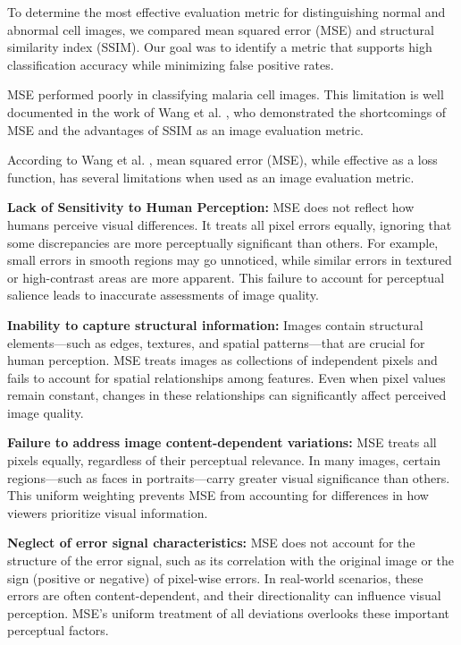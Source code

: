\documentclass[journal,12pt,onecolumn,draftcls]{IEEEtran}
\begin{document}
To determine the most effective evaluation metric for distinguishing normal and abnormal cell images, we compared mean squared error (MSE) and structural similarity index (SSIM). Our goal was to identify a metric that supports high classification accuracy while minimizing false positive rates.

MSE performed poorly in classifying malaria cell images. This limitation is well documented in the work of Wang et al. \cite{wang2009}, who demonstrated the shortcomings of MSE and the advantages of SSIM as an image evaluation metric.

According to Wang et al. \cite{wang2009}, mean squared error (MSE), while effective as a loss function, has several limitations when used as an image evaluation metric.

\textbf{Lack of Sensitivity to Human Perception:} MSE does not reflect how humans perceive visual differences. It treats all pixel errors equally, ignoring that some discrepancies are more perceptually significant than others. For example, small errors in smooth regions may go unnoticed, while similar errors in textured or high-contrast areas are more apparent. This failure to account for perceptual salience leads to inaccurate assessments of image quality.

\textbf{Inability to capture structural information:} Images contain structural elements—such as edges, textures, and spatial patterns—that are crucial for human perception. MSE treats images as collections of independent pixels and fails to account for spatial relationships among features. Even when pixel values remain constant, changes in these relationships can significantly affect perceived image quality.

\textbf{Failure to address image content-dependent variations:} MSE treats all pixels equally, regardless of their perceptual relevance. In many images, certain regions—such as faces in portraits—carry greater visual significance than others. This uniform weighting prevents MSE from accounting for differences in how viewers prioritize visual information.

\textbf{Neglect of error signal characteristics:} MSE does not account for the structure of the error signal, such as its correlation with the original image or the sign (positive or negative) of pixel-wise errors. In real-world scenarios, these errors are often content-dependent, and their directionality can influence visual perception. MSE’s uniform treatment of all deviations overlooks these important perceptual factors.
\end{document}
